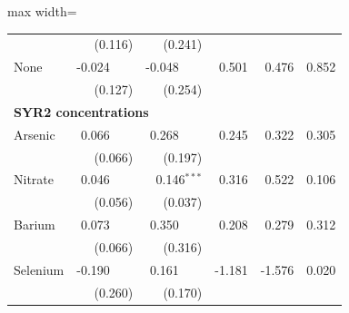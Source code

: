 \begin{table}[htbp]
{\begin{adjustbox}{max width=\linewidth}
\begin{tabular}{lrrrrr}
 & (\phantom{-}0.116)\phantom{$^{***}$} & (\phantom{-}0.241)\phantom{$^{***}$} &  &  &  \\
None & \phantom{(}-0.024$^{\phantom{*}\phantom{*}\phantom{*}}$ & \phantom{(}-0.048$^{\phantom{*}\phantom{*}\phantom{*}}$ & \phantom{(}\phantom{-}0.501\phantom{$^{***}$} & \phantom{(}\phantom{-}0.476\phantom{$^{***}$} & \phantom{(}\phantom{-}0.852\phantom{$^{***}$} \\
 & (\phantom{-}0.127)\phantom{$^{***}$} & (\phantom{-}0.254)\phantom{$^{***}$} &  &  &  \\
\multicolumn{6}{l}{\textbf{SYR2 concentrations}} \\
Arsenic & \phantom{(}\phantom{-}0.066$^{\phantom{*}\phantom{*}\phantom{*}}$ & \phantom{(}\phantom{-}0.268$^{\phantom{*}\phantom{*}\phantom{*}}$ & \phantom{(}\phantom{-}0.245\phantom{$^{***}$} & \phantom{(}\phantom{-}0.322\phantom{$^{***}$} & \phantom{(}\phantom{-}0.305\phantom{$^{***}$} \\
 & (\phantom{-}0.066)\phantom{$^{***}$} & (\phantom{-}0.197)\phantom{$^{***}$} &  &  &  \\
Nitrate & \phantom{(}\phantom{-}0.046$^{\phantom{*}\phantom{*}\phantom{*}}$ & \phantom{(}\phantom{-}0.146$^{***}$ & \phantom{(}\phantom{-}0.316\phantom{$^{***}$} & \phantom{(}\phantom{-}0.522\phantom{$^{***}$} & \phantom{(}\phantom{-}0.106\phantom{$^{***}$} \\
 & (\phantom{-}0.056)\phantom{$^{***}$} & (\phantom{-}0.037)\phantom{$^{***}$} &  &  &  \\
Barium & \phantom{(}\phantom{-}0.073$^{\phantom{*}\phantom{*}\phantom{*}}$ & \phantom{(}\phantom{-}0.350$^{\phantom{*}\phantom{*}\phantom{*}}$ & \phantom{(}\phantom{-}0.208\phantom{$^{***}$} & \phantom{(}\phantom{-}0.279\phantom{$^{***}$} & \phantom{(}\phantom{-}0.312\phantom{$^{***}$} \\
 & (\phantom{-}0.066)\phantom{$^{***}$} & (\phantom{-}0.316)\phantom{$^{***}$} &  &  &  \\
Selenium & \phantom{(}-0.190$^{\phantom{*}\phantom{*}\phantom{*}}$ & \phantom{(}\phantom{-}0.161$^{\phantom{*}\phantom{*}\phantom{*}}$ & \phantom{(}-1.181\phantom{$^{***}$} & \phantom{(}-1.576\phantom{$^{***}$} & \phantom{(}\phantom{-}0.020\phantom{$^{***}$} \\
 & (\phantom{-}0.260)\phantom{$^{***}$} & (\phantom{-}0.170)\phantom{$^{***}$} &  &  &  \\
\bottomrule
\end{tabular}
\end{adjustbox}
}
\begin{minipage}{\linewidth}

\end{minipage}
\end{table}
